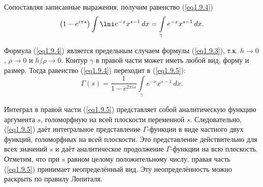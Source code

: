 Сопоставляя записанные выражения, получим равенство (\ref{eq1.9.4})
\begin{equation}
    \left(1-e^{i\pi s}\right)\int\lni e^{-x}x^{s-1}\,dx =
    \int\limits_\gamma e^{-x}x^{s-1}\,dx.
    \label{eq1.9.4}
\end{equation}

Формула (\ref{eq1.9.4}) является предельным случаем формулы (\ref{eq1.9.3}),
т.к. \( h\to0 \), \( \rho\to0\) и \(h/\rho \to 0 \). Контур \( \gamma \) в
правой части может иметь любой вид, форму и размер. Тогда равенство
(\ref{eq1.9.4}) переходит в (\ref{eq1.9.5}):
\begin{equation}
    \Gamma(s) = \frac{1}{1-e^{2\pi is}} \int\limits_\gamma e^{-x}x^{s-1}\,dx.
    \label{eq1.9.5}
\end{equation}

Интеграл в правой части (\ref{eq1.9.5}) представляет собой аналитическую функцию
аргумента \( s \), голоморфную на всей плоскости переменной \( s \).
Следовательно, (\ref{eq1.9.5}) даёт интегральное представление 
\( \Gamma \)-функции в виде частного двух функций, голоморфных на всей
плоскости. Это представление действительно для всех значений \( s \) и даёт 
аналитическое продолжение \( \Gamma \)-функции на всю плоскость. Отметим, что
при \( s \) равном целому положительному числу, правая часть (\ref{eq1.9.5})
принимает неопределённый вид. Эту неопределённость можно раскрыть по правилу
Лопиталя.

